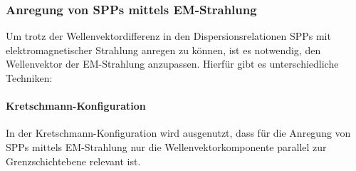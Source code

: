\documentclass[titlepage,  ngerman]{article}
\begin{document}
	\subsubsection{Anregung von SPPs mittels EM-Strahlung}
	\label{sec:exictation}
	Um trotz der Wellenvektordifferenz in den Dispersionsrelationen SPPs mit elektromagnetischer Strahlung anregen zu können, ist es notwendig, den Wellenvektor der EM-Strahlung anzupassen. Hierfür gibt es unterschiedliche Techniken:
	\paragraph{Kretschmann-Konfiguration}
	In der Kretschmann-Konfiguration wird ausgenutzt, dass für die Anregung von SPPs mittels EM-Strahlung nur die Wellenvektorkomponente parallel zur Grenzschichtebene relevant ist. 
		
\end{document}
